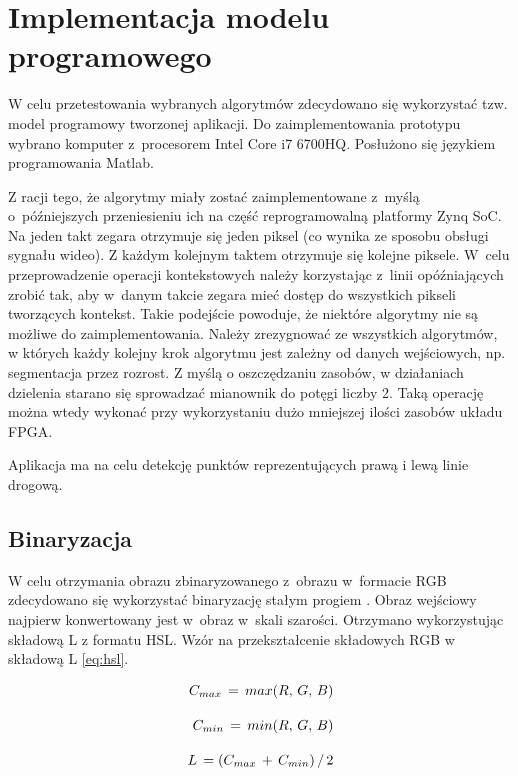 \chapter{Implementacja modelu programowego}

W celu przetestowania wybranych algorytmów zdecydowano się wykorzystać tzw. model programowy tworzonej aplikacji. 
Do zaimplementowania prototypu wybrano komputer z~procesorem Intel Core i7 6700HQ. 
Posłużono się językiem programowania Matlab.

Z racji tego, że algorytmy miały zostać zaimplementowane z~myślą o~późniejszych przeniesieniu ich na część reprogramowalną platformy Zynq SoC.
Na jeden takt zegara otrzymuje się jeden piksel (co wynika ze sposobu obsługi sygnału wideo).
Z każdym kolejnym taktem otrzymuje się kolejne piksele. W~celu przeprowadzenie operacji kontekstowych należy korzystając z~linii opóźniających zrobić tak, aby w~danym takcie zegara mieć dostęp do wszystkich pikseli tworzących kontekst. Takie podejście powoduje, że niektóre algorytmy nie są możliwe do zaimplementowania. Należy zrezygnować ze wszystkich algorytmów, w których każdy kolejny krok algorytmu jest zależny od danych wejściowych, np. segmentacja przez rozrost. 
Z myślą o oszczędzaniu zasobów, w działaniach dzielenia starano się sprowadzać mianownik do potęgi liczby 2.
Taką operację można wtedy wykonać przy wykorzystaniu dużo mniejszej ilości zasobów układu FPGA.  

Aplikacja ma na celu detekcję punktów reprezentujących prawą i lewą linie drogową. 

\section{Binaryzacja}
W celu otrzymania obrazu zbinaryzowanego z~obrazu w~formacie RGB zdecydowano się wykorzystać binaryzację stałym progiem \cite{1}. 
Obraz wejściowy najpierw konwertowany jest w~obraz w~skali szarości. Otrzymano wykorzystując składową L z formatu HSL. Wzór na przekształcenie składowych RGB w składową L \eqref{eq:hsl}. 

\begin{equation}
{\displaystyle {\begin{aligned}\,C_{max}\,=\,max(R,\,G,\,B)\\[10pt]\,C_{min}\,=\,min(R,\,G,\,B)\\[10pt]\,L\,=(C_{max}\,+\,C_{min})\,/\,2\end{aligned}}}\\[10pt]
\label{eq:hsl}
\end{equation}

